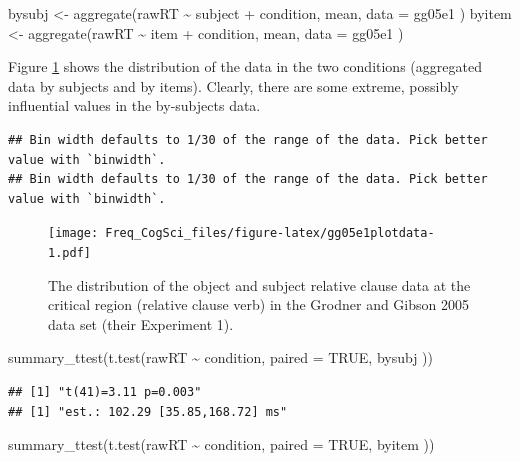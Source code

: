 \documentclass[
  12pt,
]{krantz}
\newenvironment{Shaded}{\begin{snugshade}}{\end{snugshade}}
\newcommand{\AttributeTok}[1]{\textcolor[rgb]{0.77,0.63,0.00}{#1}}
\newcommand{\ConstantTok}[1]{\textcolor[rgb]{0.00,0.00,0.00}{#1}}
\newcommand{\FunctionTok}[1]{\textcolor[rgb]{0.00,0.00,0.00}{#1}}
\newcommand{\NormalTok}[1]{#1}
\newcommand{\OtherTok}[1]{\textcolor[rgb]{0.56,0.35,0.01}{#1}}
\newcommand{\SpecialCharTok}[1]{\textcolor[rgb]{0.00,0.00,0.00}{#1}}
\theoremstyle{definition}
\theoremstyle{definition}
\theoremstyle{definition}
\theoremstyle{definition}
\theoremstyle{remark}
\begin{document}
\begin{Shaded}
\begin{Highlighting}[]
\NormalTok{bysubj }\OtherTok{\textless{}{-}} \FunctionTok{aggregate}\NormalTok{(rawRT }\SpecialCharTok{\textasciitilde{}}\NormalTok{ subject }\SpecialCharTok{+}
\NormalTok{  condition,}
\NormalTok{mean,}
\AttributeTok{data =}\NormalTok{ gg05e1}
\NormalTok{)}
\NormalTok{byitem }\OtherTok{\textless{}{-}} \FunctionTok{aggregate}\NormalTok{(rawRT }\SpecialCharTok{\textasciitilde{}}\NormalTok{ item }\SpecialCharTok{+}
\NormalTok{  condition,}
\NormalTok{mean,}
\AttributeTok{data =}\NormalTok{ gg05e1}
\NormalTok{)}
\end{Highlighting}
\end{Shaded}

Figure \ref{fig:gg05e1plotdata} shows the distribution of the data in the two conditions (aggregated data by subjects and by items). Clearly, there are some extreme, possibly influential values in the by-subjects data.

\begin{verbatim}
## Bin width defaults to 1/30 of the range of the data. Pick better value with `binwidth`.
## Bin width defaults to 1/30 of the range of the data. Pick better value with `binwidth`.
\end{verbatim}

\begin{figure}
\centering
\texttt{[image: Freq\_CogSci\_files/figure-latex/gg05e1plotdata-1.pdf]}
\caption{\label{fig:gg05e1plotdata}The distribution of the object and subject relative clause data at the critical region (relative clause verb) in the Grodner and Gibson 2005 data set (their Experiment 1).}
\end{figure}

\begin{Shaded}
\begin{Highlighting}[]
\FunctionTok{summary\_ttest}\NormalTok{(}\FunctionTok{t.test}\NormalTok{(rawRT }\SpecialCharTok{\textasciitilde{}}\NormalTok{ condition,}
  \AttributeTok{paired =} \ConstantTok{TRUE}\NormalTok{, bysubj}
\NormalTok{))}
\end{Highlighting}
\end{Shaded}

\begin{verbatim}
## [1] "t(41)=3.11 p=0.003"
## [1] "est.: 102.29 [35.85,168.72] ms"
\end{verbatim}

\begin{Shaded}
\begin{Highlighting}[]
\FunctionTok{summary\_ttest}\NormalTok{(}\FunctionTok{t.test}\NormalTok{(rawRT }\SpecialCharTok{\textasciitilde{}}\NormalTok{ condition,}
  \AttributeTok{paired =} \ConstantTok{TRUE}\NormalTok{, byitem}
\NormalTok{))}
\end{Highlighting}
\end{Shaded}
\end{document}
